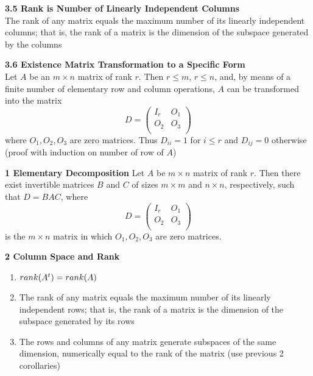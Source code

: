 \documentclass[11pt]{article}
\begin{document}
\begin{theorem*}
    \textbf{3.5 Rank is Number of Linearly Independent Columns} \\
    The rank of any matrix equals the maximum number of its linearly independent columns; that is, the rank of a matrix is the dimension of the subspace generated by the columns 
\end{theorem*}

\begin{theorem*}
    \textbf{3.6 Existence Matrix Transformation to a Specific Form} \\
    Let $A$ be an $m\times n$ matrix of rank $r$. Then $r\leq m$, $r\leq n$, and, by means of a finite number of elementary row and column operations, $A$ can be transformed into the matrix 
    \[
        D = 
        \begin{pmatrix}
            I_r & O_1 \\
            O_2 & O_3 \\ 
        \end{pmatrix}    
    \] 
    where $O_1, O_2, O_3$ are zero matrices. Thus $D_{ii}=1$ for $i\leq r$ and $D_{ij}=0$ otherwise (proof with induction on number of row of $A$)
\end{theorem*}


\begin{corollary*}
    \textbf{1 Elementary Decomposition} Let $A$ be $m\times n$ matrix of rank $r$. Then there exist invertible matrices $B$ and $C$ of sizes $m\times m$ and $n\times n$, respectively, such that $D = BAC$, where 
    \[
        D = 
        \begin{pmatrix}
            I_r & O_1 \\
            O_2 & O_3 \\ 
        \end{pmatrix}    
    \]
    is the $m\times n$ matrix in which $O_1,O_2,O_3$ are zero matrices.
\end{corollary*}

\begin{corollary*}
    \textbf{2 Column Space and Rank} 
    \begin{enumerate}
        \item $rank(A^t) = rank(A)$
        \item The rank of any matrix equals the maximum number of its linearly independent rows; that is, the rank of a matrix is the dimension of the subspace generated by its rows
        \item The rows and columns of any matrix generate subspaces of the same dimension, numerically equal to the rank of the matrix (use previous 2 corollaries)
    \end{enumerate}
\end{corollary*}
\end{document}
